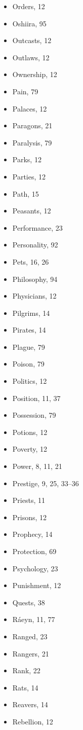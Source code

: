 \begin{multicols}{2}
\begin{itemize}
  \item Orders, 12
  \item Oshiira, 95
  \item Outcasts, 12
  \item Outlaws, 12
  \item Ownership, 12
  \item Pain, 79
  \item Palaces, 12
  \item Paragons, 21
  \item Paralysis, 79
  \item Parks, 12
  \item Parties, 12
  \item Path, 15
  \item Peasants, 12
  \item Performance, 23
  \item Personality, 92
  \item Pets, 16, 26
  \item Philosophy, 94
  \item Physicians, 12
  \item Pilgrims, 14
  \item Pirates, 14
  \item Plague, 79
  \item Poison, 79
  \item Politics, 12
  \item Position, 11, 37
  \item Possession, 79
  \item Potions, 12
  \item Poverty, 12
  \item Power, 8, 11, 21
  \item Prestige, 9, 25, 33--36
  \item Priests, 11
  \item Prisons, 12
  \item Prophecy, 14
  \item Protection, 69
  \item Psychology, 23
  \item Punishment, 12
  \item Quests, 38
  \item Ráeyn, 11, 77
  \item Ranged, 23
  \item Rangers, 21
  \item Rank, 22
  \item Rats, 14
  \item Reavers, 14
  \item Rebellion, 12

\end{itemize}
\end{multicols}
